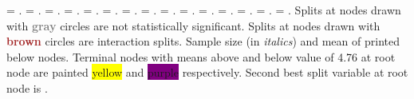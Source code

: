 \documentclass{article}
\begin{document}
\begin{landscape}
\texttt{} = \texttt{}.
\texttt{} = \texttt{}.
\texttt{} = \texttt{}.
\texttt{} = \texttt{}.
\texttt{} = \texttt{}.
\texttt{} = \texttt{}.
\texttt{} = \texttt{}.
\texttt{} = \texttt{}.
\texttt{} = \texttt{}.
\texttt{} = \texttt{}.
\texttt{} = \texttt{}.
\texttt{} = \texttt{}.
\texttt{} = \texttt{}.
\texttt{} = \texttt{}.
\texttt{} = \texttt{}.
 Splits at nodes drawn with \textbf{\textcolor{gray}{gray}} circles are not statistically significant.
 Splits at nodes drawn with \textbf{\textcolor{brown}{brown}} circles are interaction splits.
Sample size (in \emph{italics}) and mean of \texttt{} printed below nodes.
 Terminal nodes with means above and below value of  4.76 at root node are painted \colorbox{yellow}{yellow} and \colorbox{purple}{purple} respectively.
 Second best split variable at root node is \texttt{}.
 \end{landscape}
 
\end{document}
